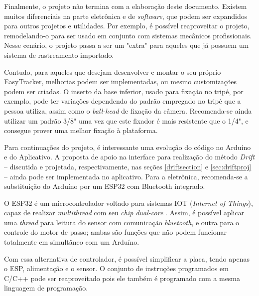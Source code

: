 Finalmente, o projeto não termina com a elaboração deste documento. Existem muitos diferenciais na parte eletrônica e de \textit{software}, que podem ser expandidos para outros projetos e utilidades. Por exemplo, é possível reaproveitar o projeto, remodelando-o para ser usado em conjunto com sistemas mecânicos profissionais. Nesse cenário, o projeto passa a ser um "extra" para aqueles que já possuem um sistema de rastreamento importado. 

Contudo, para aqueles que desejam desenvolver e montar o seu próprio EasyTracker, melhorias podem ser implementadas, ou mesmo customizações podem ser criadas. O inserto da base inferior, usado para fixação no tripé, por exemplo, pode ter variações dependendo do padrão empregado no tripé que a pessoa utiliza, assim como o \textit{ball-head} de fixação da câmera. Recomenda-se ainda utilizar um padrão 3/8" uma vez que este fixador é mais resistente que o 1/4", e consegue prover uma melhor fixação à plataforma.

Para continuações do projeto, é interessante uma evolução do código no Arduíno e do Aplicativo. A proposta de apoio na interface para realização do método \textit{Drift} -- discutida e projetada, respectivamente, nas seções \ref{driftsection} e \ref{sec:driftproj} -- ainda pode ser implementada no aplicativo. Para a eletrônica, recomenda-se a substituição do Arduíno por um ESP32 com Bluetooth integrado.

O ESP32 é um microcontrolador voltado para sistemas IOT (\textit{Internet of Things}), capaz de realizar \textit{multithread} com seu \textit{chip dual-core} \cite{man:ESP32}. Assim, é possível aplicar uma \textit{thread} para leitura do sensor com comunicação \textit{bluetooth}, e outra para o controle do motor de passo; ambas são funções que não podem funcionar totalmente em simultâneo com um Arduíno.

Com essa alternativa de controlador, é possível simplificar a placa, tendo apenas o ESP, alimentação e o sensor. O conjunto de instruções programados em C/C++ pode ser reaproveitado pois ele também é programado com a mesma linguagem de programação.